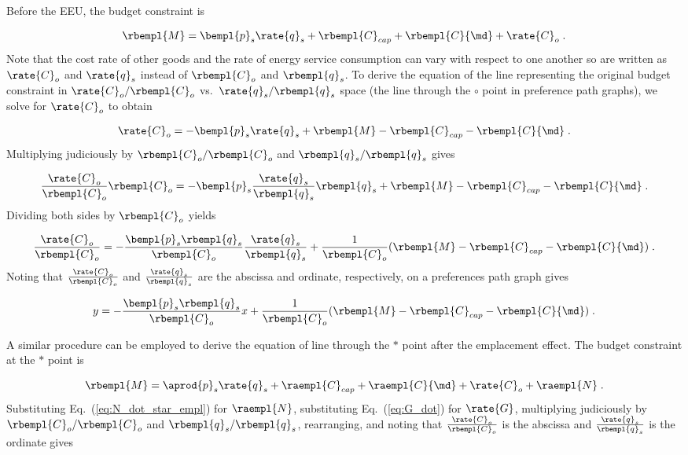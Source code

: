 Before the EEU, the budget constraint is

\begin{equation}
  \rbempl{M} = \bempl{p}_s \rate{q}_s + \rbempl{C}_{cap} + \rbempl{C}{\md} + \rate{C}_o \; .
\end{equation}
%
Note that the cost rate of other goods and the rate of energy service consumption
can vary with respect to one another so are written as
$\rate{C}_o$ and $\rate{q}_s$
instead of $\rbempl{C}_o$ and $\rbempl{q}_s$.
To derive the equation of the line representing the original budget constraint 
in $\rate{C}_o/\rbempl{C}_o$ vs.\ $\rate{q}_s/\rbempl{q}_s$ space
(the \circcirc{} line through the $\circ$ point
in preference path graphs), 
we solve for $\rate{C}_o$ to obtain

\begin{equation}
  \rate{C}_o = - \bempl{p}_s \rate{q}_s + \rbempl{M} - \rbempl{C}_{cap} - \rbempl{C}{\md} \; .
\end{equation}
%
Multiplying judiciously by $\rbempl{C}_o/\rbempl{C}_o$ and $\rbempl{q}_s/\rbempl{q}_s$ gives

\begin{equation}
  \frac{\rate{C}_o}{\rbempl{C}_o} \rbempl{C}_o
       = - \bempl{p}_s \frac{\rate{q}_s}{\rbempl{q}_s} \rbempl{q}_s 
         + \rbempl{M} - \rbempl{C}_{cap} - \rbempl{C}{\md} \; .
\end{equation}
%
Dividing both sides by $\rbempl{C}_o$ yields

\begin{equation}
  \frac{\rate{C}_o}{\rbempl{C}_o}
       = - \frac{\bempl{p}_s \rbempl{q}_s}{\rbempl{C}_o} \frac{\rate{q}_s}{\rbempl{q}_s}
         + \frac{1}{\rbempl{C}_o} (\rbempl{M} - \rbempl{C}_{cap} - \rbempl{C}{\md}) \; .
\end{equation}
%
Noting that $\frac{\rate{C}_o}{\rbempl{C}_o}$ and 
$\frac{\rate{q}_s}{\rbempl{q}_s}$ are
the abscissa and ordinate, respectively,
on a preferences path graph gives

\begin{equation} \label{eq:orig_line_prefs}
  y = - \frac{\bempl{p}_s \rbempl{q}_s}{\rbempl{C}_o} x
         + \frac{1}{\rbempl{C}_o} (\rbempl{M} - \rbempl{C}_{cap} - \rbempl{C}{\md}) \; .
\end{equation}

A similar procedure can be employed to derive the equation of 
\starstar{} line through the $*$ point
after the emplacement effect.
The budget constraint at the $*$ point is

\begin{equation}
  \rbempl{M} = \aprod{p}_s \rate{q}_s + \raempl{C}_{cap} + \raempl{C}{\md} + \rate{C}_o + \raempl{N} \; .
\end{equation}
%
Substituting Eq.~(\ref{eq:N_dot_star_empl}) for $\raempl{N}$,
substituting Eq.~(\ref{eq:G_dot}) for $\rate{G}$,
multiplying judiciously by $\rbempl{C}_o/\rbempl{C}_o$ and $\rbempl{q}_s/\rbempl{q}_s$, 
rearranging, and noting that 
$\frac{\rate{C}_o}{\rbempl{C}_o}$ is the abscissa and 
$\frac{\rate{q}_s}{\rbempl{q}_s}$ is the ordinate gives


